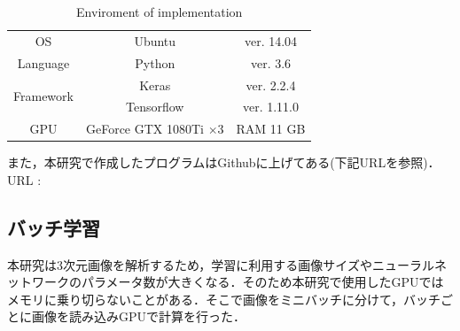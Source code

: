 \begin{table}[H]
	\centering
	\caption{Enviroment of implementation}
	\label{tab:環境}
	\begin{tabular}{ccc}\toprule
		OS & Ubuntu & ver. 14.04 \\ 
		Language & Python & ver. 3.6 \\ 
		\multirow{2}{*}{Framework} & Keras & ver. 2.2.4 \\ 
		& Tensorflow & ver. 1.11.0 \\ 
		GPU & GeForce GTX 1080Ti $\times$3 & RAM 11 GB \\  \bottomrule
	\end{tabular}
\end{table}

また，本研究で作成したプログラムはGithubに上げてある(下記URLを参照)．
URL : 


\subsection*{バッチ学習}
本研究は3次元画像を解析するため，学習に利用する画像サイズやニューラルネットワークのパラメータ数が大きくなる．そのため本研究で使用したGPUではメモリに乗り切らないことがある．そこで画像をミニバッチに分けて，バッチごとに画像を読み込みGPUで計算を行った．
